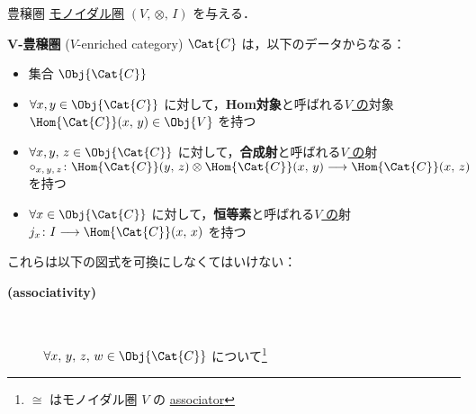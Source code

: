 \documentclass[TQFT_main]{subfiles}
\begin{document}
\begin{mydef}[label=def:enriched,breakable]{豊穣圏}
    \hyperref[redef:monoidal-category]{モノイダル圏} $(V,\, \otimes,\, I)$ を与える．

    $\bm{V}$\textbf{-豊穣圏} ($V$-enriched category) $\Cat{C}$ は，以下のデータからなる：
    \begin{itemize}
        \item 集合 $\Obj{\Cat{C}}$
        \item $\forall x, y \in \Obj{\Cat{C}}$ に対して，\textbf{Hom対象}と呼ばれる\underline{$V$ の}対象 $\Hom{\Cat{C}}(x,\, y) \in \Obj{V}$ を持つ
        \item $\forall x, y,\, z \in \Obj{\Cat{C}}$ に対して，\textbf{合成射}と呼ばれる\underline{$V$ の}射 $\circ_{x,\, y,\, z} \colon \Hom{\Cat{C}}(y,\, z) \otimes \Hom{\Cat{C}}(x,\, y) \lto \Hom{\Cat{C}} (x,\, z)$ を持つ
        \item $\forall x \in \Obj{\Cat{C}}$ に対して，\textbf{恒等素}と呼ばれる\underline{$V$ の}射 $j_x \colon I \lto \Hom{\Cat{C}} (x,\, x)$ を持つ
    \end{itemize}
    これらは以下の図式を可換にしなくてはいけない：
    \begin{description}
        \item[\textbf{(associativity)}]　
        
        $\forall x,\, y,\, z,\, w \in \Obj{\Cat{C}}$ について\footnote{$\cong$ はモノイダル圏 $V$ の \hyperref[def:monoidal-category]{associator}}
        \begin{flushleft}
        \end{flushleft}
        

\end{description}
\end{mydef}
\end{document}
